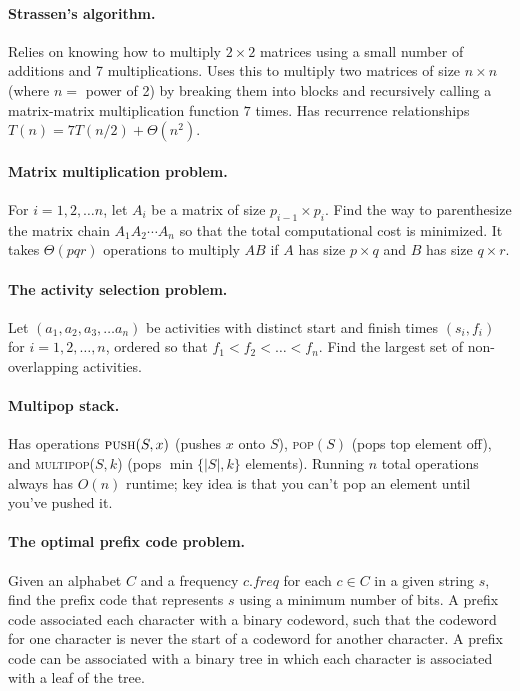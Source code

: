 \documentclass[11  pt]{exam}
\begin{document}
	\paragraph{Strassen's algorithm.} Relies on knowing how to multiply $2 \times 2$ matrices using a small number of additions and 7 multiplications. Uses this to multiply two matrices of size $n\times n$ (where $n = $ power of 2) by breaking them into blocks and recursively calling a matrix-matrix multiplication function $7$ times. Has recurrence relationships $T(n) = 7T(n/2) + \Theta(n^2)$.
	
	\paragraph{Matrix multiplication problem.} 
	For $i = 1, 2, \hdots n$, let $A_i$ be a matrix of size $p_{i-1} \times p_i$. Find the way to parenthesize the matrix chain $A_1 A_2 \cdots A_n$ so that the total computational cost is minimized. It takes $\Theta(pqr)$ operations to multiply $AB$ if $A$ has size $p \times q$ and $B$ has size $q \times r$.
	
	\paragraph{The activity selection problem.} 
	Let $(a_1, a_2, a_3, \hdots a_n)$ be activities with distinct start and finish times $(s_i, f_i)$ for $i = 1,2, \hdots, n$, ordered so that $f_1 < f_2 < \hdots < f_n$. Find the largest set of non-overlapping activities. 
	
	\paragraph{Multipop stack.} 
	Has operations $\textsc{push}(S,x)$ (pushes $x$ onto $S$), \textsc{pop}$(S)$ (pops top element off), and \textsc{multipop}($S,k$) (pops $\min\{|S|,k\}$ elements). Running $n$ total operations always has $O(n)$ runtime; key idea is that you can't pop an element until you've pushed it.
	
	\paragraph{The optimal prefix code problem.} Given an alphabet $C$ and a frequency $\mathit{c.freq}$ for each $c \in C$ in a given string $s$,  find the prefix code that represents $s$ using a minimum number of bits. A prefix code associated each character with a binary codeword, such that the codeword for one character is never the start of a codeword for another character. A prefix code can be associated with a binary tree in which each character is associated with a leaf of the tree.
	
\end{document}
